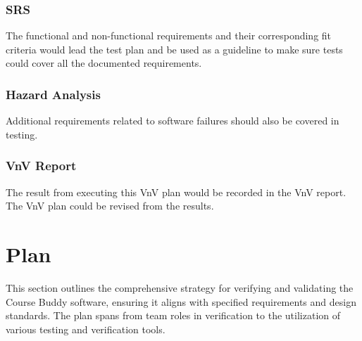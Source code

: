 \documentclass[12pt, titlepage]{article}
\begin{document}
\subsubsection{SRS}
The functional and non-functional requirements and their corresponding fit criteria would lead the test plan and be used as a guideline to make sure tests could cover all the documented requirements.
\subsubsection{Hazard Analysis}
Additional requirements related to software failures should also be covered in testing.
\subsubsection{VnV Report}
The result from executing this VnV plan would be recorded in the VnV report.  The VnV plan could be revised from the results.
\section{Plan}

This section outlines the comprehensive strategy for verifying and validating the Course Buddy software, ensuring it aligns with specified requirements and design standards. The plan spans from team roles in verification to the utilization of various testing and verification tools.
\end{document}
